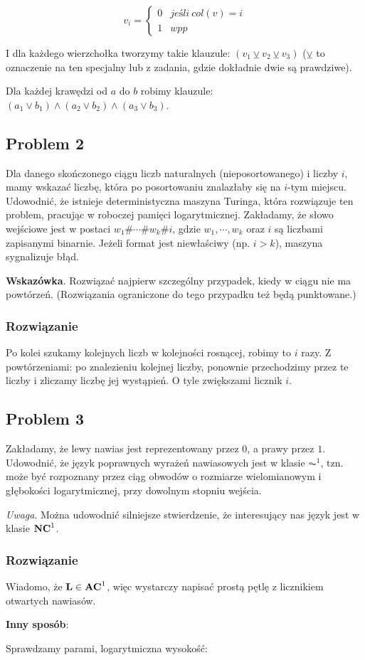 \[
    v_i = \left\{ \begin{array}{ll} 0 & jeśli\ col(v) = i \\ 1 & wpp \end{array} \right.
\]

I dla każdego wierzchołka tworzymy takie klauzule: $(v_1 \veebar v_2 \veebar v_3)$ ($\veebar$ to oznaczenie na ten specjalny lub z zadania, gdzie dokładnie dwie są prawdziwe).

Dla każdej krawędzi od $a$ do $b$ robimy klauzule: $(a_1 \lor b_1) \land (a_2 \lor b_2) \land (a_3 \lor b_3)$.

\subsection{Problem 2}
Dla danego skończonego ciągu liczb naturalnych (nieposortowanego) i liczby $i$, mamy wskazać liczbę, która po posortowaniu znalazłaby się na $i$-tym miejscu. Udowodnić, że istnieje deterministyczna maszyna Turinga, która rozwiązuje ten problem, pracując w roboczej pamięci logarytmicznej. Zakładamy, że słowo wejściowe jest w postaci $w_1\#\cdots\#w_k\#i$, gdzie $w_1, \cdots, w_k$ oraz $i$ są liczbami zapisanymi binarnie. Jeżeli format jest niewłaściwy (np. $i > k$), maszyna sygnalizuje błąd.

\textbf{Wskazówka}. Rozwiązać najpierw szczególny przypadek, kiedy w ciągu nie ma powtórzeń. (Rozwiązania ograniczone do tego przypadku też będą punktowane.)

\subsubsection*{Rozwiązanie}

Po kolei szukamy kolejnych liczb w kolejności rosnącej, robimy to $i$ razy. Z powtórzeniami: po znalezieniu kolejnej liczby, ponownie przechodzimy przez te liczby i zliczamy liczbę jej wystąpień. O tyle zwiększami licznik $i$.

\subsection{Problem 3}
Zakładamy, że lewy nawias jest reprezentowany przez $0$, a prawy przez $1$. Udowodnić, że język poprawnych wyrażeń nawiasowych jest w klasie $\AC^1$, tzn. może być rozpoznany przez ciąg obwodów o rozmiarze wielomianowym i głębokości logarytmicznej, przy dowolnym stopniu wejścia.

\textit{Uwaga}. Można udowodnić silniejsze stwierdzenie, że interesujący nas język jest w klasie $\textbf{NC}^1$.

\subsubsection*{Rozwiązanie}

Wiadomo, że $\textbf{L} \in \textbf{AC}^1$, więc wystarczy napisać prostą pętlę z licznikiem otwartych nawiasów.


\textbf{Inny sposób}:

Sprawdzamy parami, logarytmiczna wysokość:

